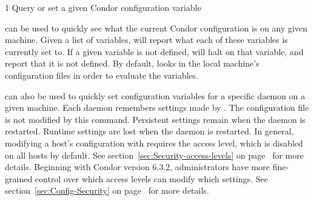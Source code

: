 \begin{ManPage}{\label{man-condor-config-val}}{1}
{Query or set a given Condor configuration variable}
\Synopsis {}










\Description

 can be used to quickly see what the current
Condor configuration is on any given machine.  Given a list of
variables,  will report what each of these
variables is currently set to.  If a given variable is not defined,
 will halt on that variable, and report that it is
not defined.  By default,  looks in the local
machine's configuration files in order to evaluate the variables.

 can also be used to quickly set configuration
variables for a specific daemon on a given machine.  Each daemon
remembers settings made by .  The configuration
file is not modified by this command.  Persistent settings remain when
the daemon is restarted.  Runtime settings are lost when the daemon is
restarted.  In general, modifying a host's configuration with
requires the  access level, which is disabled on all
hosts by default.  See section~\ref{sec:Security-access-levels} on
page~\pageref{sec:Security-access-levels} for more details.
Beginning with Condor version 6.3.2, administrators have more
fine-grained control over which access levels can modify which
settings.
See section~\ref{sec:Config-Security} on
page~\pageref{sec:Config-Security} for more details.


\end{ManPage}
